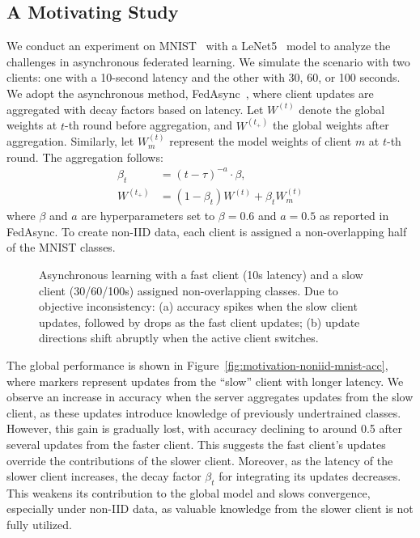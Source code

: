 \subsection{A Motivating Study}
We conduct an experiment on MNIST~\cite{deng2012mnist} with a LeNet5~\cite{lecun1998gradient} model to analyze the challenges in asynchronous federated learning.
We simulate the scenario with two clients: one with a 10-second latency and the other with 30, 60, or 100 seconds. We adopt the asynchronous method, FedAsync~\cite{xie2019asynchronous}, where client updates are aggregated with decay factors based on latency. Let $W^{(t)}$ denote the global weights at $t$-th round before aggregation, and $W^{(t_+)}$ the global weights after aggregation. Similarly, let $W_m^{(t)}$ represent the model weights of client $m$ at $t$-th round. The aggregation follows:
\begin{align}
\beta_t &= (t-\tau)^{-a}\cdot\beta, \\
W^{(t_+)} &= (1-\beta_t) W^{(t)} + \beta_t W^{(t)}_m
\label{eq:fedasync}
\end{align}
where $\beta$ and $a$ are hyperparameters set to $\beta=0.6$ and $a=0.5$ as reported in FedAsync.
To create non-IID data, each client is assigned a non-overlapping half of the MNIST classes. 

\begin{wrapfigure}{r}{0.55\textwidth}
    \centering
    \caption{
    Asynchronous learning with a fast client (10s latency) and a slow client (30/60/100s) assigned non-overlapping classes. Due to objective inconsistency: (a) accuracy spikes when the slow client updates, followed by drops as the fast client updates; (b) update directions shift abruptly when the active client switches.
    }
\end{wrapfigure}

The global performance is shown in Figure~\ref{fig:motivation-noniid-mnist-acc}, where markers represent updates from the ``slow'' client with longer latency. We observe an increase in accuracy when the server aggregates updates from the slow client, as these updates introduce knowledge of previously undertrained classes. However, this gain is gradually lost, with accuracy declining to around 0.5 after several updates from the faster client. 
This suggests the fast client's updates override the contributions of the slower client. 
Moreover, as the latency of the slower client increases, the decay factor $\beta_t$ for integrating its updates decreases. This weakens its contribution to the global model and slows convergence, especially under non-IID data, as valuable knowledge from the slower client is not fully utilized.

